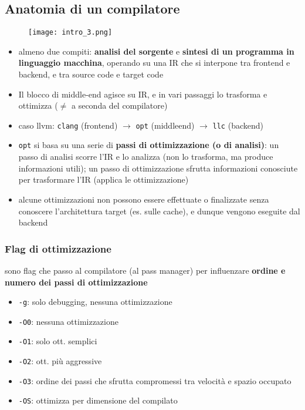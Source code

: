 \subsection{Anatomia di un compilatore}

\begin{figure}[h]
  \centering
  \texttt{[image: intro\_3.png]}
\end{figure}

\begin{itemize}
  \item almeno due compiti: \textbf{analisi del sorgente} e \textbf{sintesi di un programma in linguaggio macchina}, operando su una IR che si interpone tra frontend e backend, e tra source code e target code
  \item Il blocco di middle-end agisce su IR, e in vari passaggi lo trasforma e ottimizza ($\neq$ a seconda del compilatore)
  \item caso llvm: \lstinline|clang| (frontend) $\rightarrow$ \lstinline|opt| (middleend) $\rightarrow$ \lstinline|llc| (backend)
  \item \lstinline|opt| si basa su una serie di \textbf{passi di ottimizzazione (o di analisi)}: un passo di analisi scorre l'IR e lo analizza (non lo trasforma, ma produce informazioni utili); un passo di ottimizzazione sfrutta informazioni conosciute per trasformare l'IR (applica le ottimizzazione)
  \item alcune ottimizzazioni non possono essere effettuate o finalizzate senza conoscere l'architettura target (es. sulle cache), e dunque vengono eseguite dal backend
\end{itemize}

\subsubsection{Flag di ottimizzazione}

sono flag che passo al compilatore (al pass manager) per influenzare \textbf{ordine e numero dei passi di ottimizzazione}
\begin{multicols}{2}
\begin{itemize}
  \item \lstinline|-g|: solo debugging, nessuna ottimizzazione
  \item \lstinline|-O0|: nessuna ottimizzazione
  \item \lstinline|-O1|: solo ott. semplici
  \item \lstinline|-O2|: ott. pi\`u aggressive
  \item \lstinline|-O3|: ordine dei passi che sfrutta compromessi tra velocit\`a e spazio occupato
  \item \lstinline|-OS|: ottimizza per dimensione del compilato
\end{itemize}
\end{multicols}


